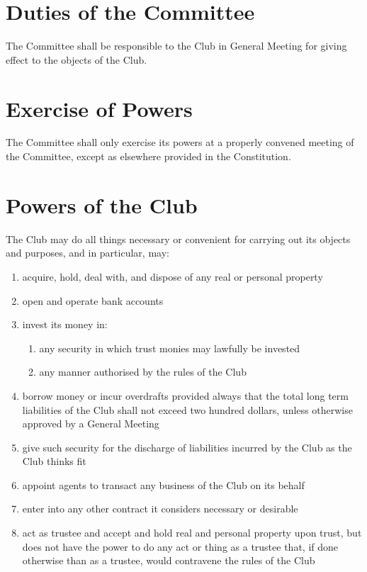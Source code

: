 \documentclass[11pt]{article} %
\begin{document}
\section{Duties of the Committee}
The Committee shall be responsible to the Club in General Meeting for giving effect to the objects of the Club.

\section{Exercise of Powers}
The Committee shall only exercise its powers at a properly convened meeting of the Committee, except as elsewhere provided in the Constitution.

\section{Powers of the Club}
The Club may do all things necessary or convenient for carrying out its objects and purposes, and in particular, may:
\begin{enumerate}
	\item acquire, hold, deal with, and dispose of any real or personal property
	\item open and operate bank accounts
	\item invest its money in:
	\begin{enumerate}[1.]
			\item any security in which trust monies may lawfully be invested
			\item any manner authorised by the rules of the Club
		\end{enumerate}
	\item borrow money or incur overdrafts provided always that the total long term liabilities of the Club shall not exceed two hundred dollars, unless otherwise approved by a General Meeting
	\item give such security for the discharge of liabilities incurred by the Club as the Club thinks fit
	\item appoint agents to transact any business of the Club on its behalf
	\item enter into any other contract it considers necessary or desirable
	\item act as trustee and accept and hold real and personal property upon trust, but does not have the power to do any act or thing as a trustee that, if done otherwise than as a trustee, would contravene the rules of the Club
\end{enumerate}
\end{document}
